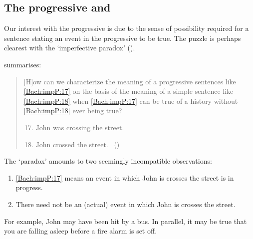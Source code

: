 \subsection{The progressive and \assuPP{}}

\begin{note}
  Our interest with the progressive is due to the sense of possibility required for a sentence stating an event in the progressive to be true.
  The puzzle is perhaps clearest with the `imperfective paradox' (\cite[cf.][Ch.3.1]{Dowty:1979vq}).

  \citeauthor{Bach:1986tb} summarises:
  \begin{quote}
    [H]ow can we characterize the meaning of a progressive sentences like \ref{Bach:impP:17} on the basis of the meaning of a simple sentence like \ref{Bach:impP:18} when \ref{Bach:impP:17} can be true of a history without \ref{Bach:impP:18} ever being true?
    \begin{enumerate}[label=(\arabic*), ref=(\arabic*)]
      \setcounter{enumi}{16}
    \item
      \label{Bach:impP:17}
      John was crossing the street.
    \item
      \label{Bach:impP:18}
      John crossed the street.%
      \mbox{ }\hfill\mbox{(\citeyear[12]{Bach:1986tb})}
    \end{enumerate}
  \end{quote}
\end{note}

\begin{note}
  The `paradox' amounts to two seemingly incompatible observations:
  \begin{enumerate}[noitemsep]
  \item
    \ref{Bach:impP:17} means an event in which John is crosses the street is in progress.
  \item
    There need not be an (actual) event in which John is crosses the street.%
  \end{enumerate}

  For example, John may have been hit by a bus.
  In parallel, it may be true that you are falling asleep before a fire alarm is set off.
\end{note}

